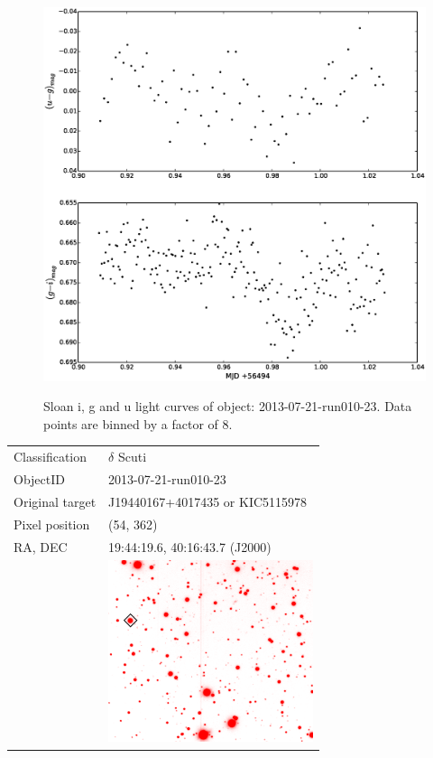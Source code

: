 \begin{figure}
  \center
  \includegraphics[width=120mm]{images/2013-07-21-run010-23_colourcurve-bin8.eps} \\
  \label{fig:2013-07-21-run010-23-colour}
  \caption{Sloan i, g and u light curves of object: 2013-07-21-run010-23. Data points are binned by a factor of 8.}
\end{figure}



\begin{tabular}{l l}
  Classification & $\delta$ Scuti \\
  ObjectID & 2013-07-21-run010-23 \\
  Original target & J19440167+4017435 or KIC5115978 \\
  Pixel position & (54, 362) \\
  RA, DEC & 19:44:19.6, 40:16:43.7 (J2000) \\
       & \includegraphics[width=60mm]{images/2013-07-21-run010-23.png} \\
\end{tabular}

